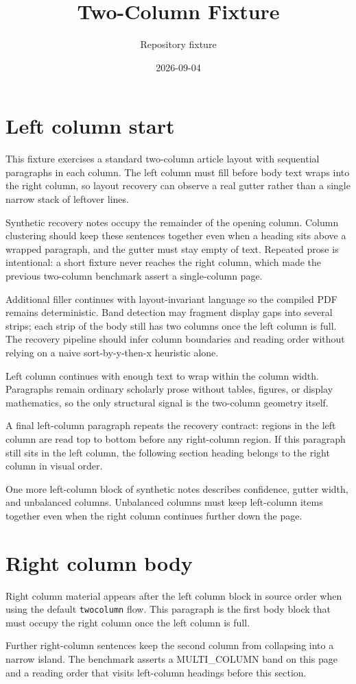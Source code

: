 \documentclass[11pt,a4paper,twocolumn]{article}
\title{Two-Column Fixture}
\author{Repository fixture}
\date{2026-09-04}%
\begin{document}
\maketitle

\section{Left column start}
This fixture exercises a standard two-column article layout with sequential
paragraphs in each column. The left column must fill before body text wraps
into the right column, so layout recovery can observe a real gutter rather
than a single narrow stack of leftover lines.

Synthetic recovery notes occupy the remainder of the opening column. Column
clustering should keep these sentences together even when a heading sits
above a wrapped paragraph, and the gutter must stay empty of text. Repeated
prose is intentional: a short fixture never reaches the right column, which
made the previous two-column benchmark assert a single-column page.

Additional filler continues with layout-invariant language so the compiled
PDF remains deterministic. Band detection may fragment display gaps into
several strips; each strip of the body still has two columns once the left
column is full. The recovery pipeline should infer column boundaries and
reading order without relying on a naive sort-by-y-then-x heuristic alone.

Left column continues with enough text to wrap within the column width.
Paragraphs remain ordinary scholarly prose without tables, figures, or
display mathematics, so the only structural signal is the two-column
geometry itself.

A final left-column paragraph repeats the recovery contract: regions in the
left column are read top to bottom before any right-column region. If this
paragraph still sits in the left column, the following section heading
belongs to the right column in visual order.

One more left-column block of synthetic notes describes confidence, gutter
width, and unbalanced columns. Unbalanced columns must keep left-column
items together even when the right column continues further down the page.

\section{Right column body}
Right column material appears after the left column block in source order
when using the default \texttt{twocolumn} flow. This paragraph is the first
body block that must occupy the right column once the left column is full.

Further right-column sentences keep the second column from collapsing into
a narrow island. The benchmark asserts a MULTI\_COLUMN band on this page
and a reading order that visits left-column headings before this section.
\end{document}
